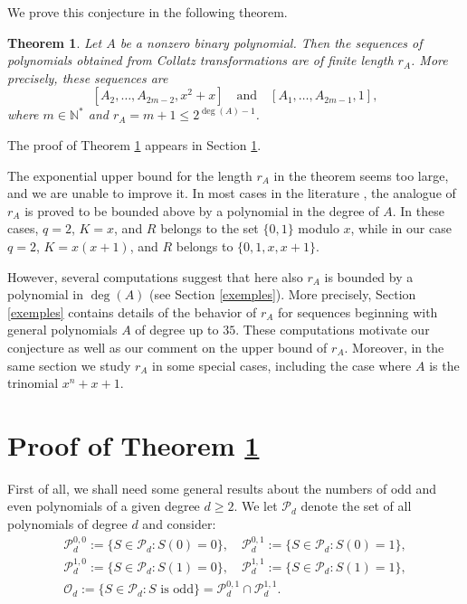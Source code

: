 \documentclass [12pt]{article}
\newtheorem{theorem}{Theorem}[section]
\begin{document}
We prove this conjecture in the following theorem.

\begin{theorem}\label{collatz0}
Let $A$ be a nonzero binary polynomial. Then the sequences of polynomials obtained from Collatz transformations are of finite length $r_A$. More precisely, these sequences are
\[
[A_2, \ldots, A_{2m-2}, x^2+x] \quad \text{and} \quad [A_1, \ldots, A_{2m-1},1],
\]
where $m \in \mathbb{N}^*$ and $r_A = m+1 \leq 2^{\deg(A)-1}$.
\end{theorem}

The proof of Theorem \ref{collatz0} appears in Section \ref{theoremproof}.

The exponential upper bound for the length $r_A$ in the theorem seems too large, and we are unable to improve it.
In most cases in the literature \cite{Paran2023,Alon,Paran2025,Yucas}, the analogue of $r_A$ is proved to be bounded above by a polynomial in the degree of $A$. In these cases, 
$q=2$, $K = x$, and $R$ belongs to the set $\{0,1\}$ modulo $x$, while in our case 
$q=2$, $K = x(x+1)$, and $R$ belongs to $\{0,1,x,x+1\}$.

However, several computations suggest that here also $r_A$ is bounded by a polynomial in $\deg(A)$ (see Section \ref{exemples}). More precisely, Section \ref{exemples} contains details of the behavior of $r_A$ for sequences beginning with general polynomials $A$ of degree up to $35$. These computations motivate our conjecture as well as our comment on the upper bound of $r_A$. Moreover, in the same section we study $r_A$ in some special cases, including the case where $A$ is the trinomial $x^n+x+1$.

\section{Proof of Theorem \ref{collatz0}} \label{theoremproof}

First of all, we shall need some general results about the numbers of odd and even polynomials of a given degree $d \geq 2$.  
We let ${\mathcal{P}}_d$ denote the set of all polynomials of degree $d$ and consider:
\[
\begin{array}{l}
{\mathcal{P}}^{0,0}_d := \{S \in {\mathcal{P}}_d : S(0) = 0\}, \quad 
{\mathcal{P}}^{0,1}_d := \{S \in {\mathcal{P}}_d : S(0) = 1\}, \\[6pt]
{\mathcal{P}}^{1,0}_d := \{S \in {\mathcal{P}}_d : S(1) = 0\}, \quad 
{\mathcal{P}}^{1,1}_d := \{S \in {\mathcal{P}}_d : S(1) = 1\}, \\[6pt]
{\mathcal{O}}_d := \{S \in {\mathcal{P}}_d : S \text{ is odd}\} =  {\mathcal{P}}^{0,1}_d \cap {\mathcal{P}}^{1,1}_d.
\end{array}
\]
\end{document}
